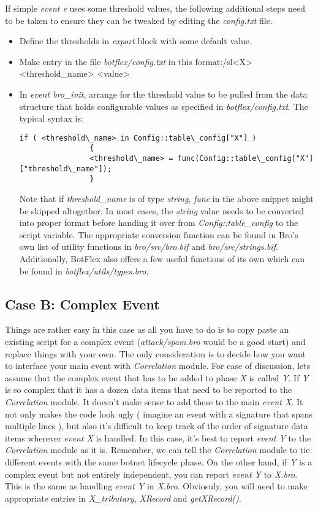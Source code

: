 \documentclass[acmtocl]{acmtrans2m}
\begin{document}
If simple \textit{event e} uses some threshold values, the
following additional steps need to be taken to ensure they 
can be tweaked by editing the \textit{config.txt} file.
\begin{itemize}
\item Define the thresholds in \textit{export} block with some
default value.
\item Make entry in the file \textit{botflex/config.txt}
in this format:/sl{<X> <threshold\_name> <value>}
\item In \textit{event bro\_init}, arrange for the threshold value
to be pulled from the data structure that holds configurable
values as specified in \textit{botflex/config.txt}.
The typical syntax is:
\begin{verbatim}
if ( <threshold\_name> in Config::table\_config["X"] )
				{
				<threshold\_name> = func(Config::table\_config["X"]["threshold\_name"]);
				}
\end{verbatim}

Note that if \textit{threshold\_name} is of type \textit{string}, 
\textit{func} in the above snippet might be skipped altogether. 
In most cases, the \textit{string} value needs to be converted into
proper format before handing it over from \textit{Config::table\_config}
to the script variable. The appropriate conversion function can be 
found in Bro's own list of utility functions in \textit{bro/src/bro.bif}
and \textit{bro/src/strings.bif}. Additionally, BotFlex also offers a few
useful functions of its own which can be found in 
\textit{botflex/utils/types.bro}.  				
\end{itemize}

\subsection{Case B: Complex Event}
Things are rather easy in this case as all you have to do
is to copy paste an existing script for a complex event
(\textit{attack/spam.bro} would be a good start)
and replace things with your own. The only consideration is
to decide how you want to interface your main event with
\textit{Correlation} module. For ease of discussion, lets assume 
that the complex event that has to be added to phase \textit{X} is called 
\textit{Y}. If \textit{Y} is so complex that it has a dozen data items 
that need to be reported to the \textit{Correlation} module.
It doesn't make sense to add these to the main \textit{event X}.
It not only makes the code look ugly ( imagine an event with a
signature that spans multiple lines ), but also it's difficult
to keep track of the order of signature data items wherever
\textit{event X} is handled. In this case, it's best to report 
\textit{event Y} to the \textit{Correlation} module as it is. 
Remember, we can tell the \textit{Correlation} module to tie different
events with the same botnet lifecycle phase. On the other hand,
if \textit{Y} is a complex event but not entirely independent, you
can report \textit{event Y} to \textit{X.bro}. This is the same as 
handling \textit{event Y} in \textit{X.bro}. Obviosuly, you will need to
make appropriate entries in \textit{X\_tributary}, \textit{XRecord} and 
\textit{getXRecord()}.
\end{document}
